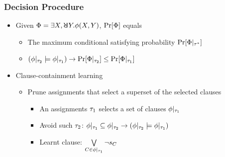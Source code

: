 \begin{frame}
    \frametitle{Decision Procedure}
    \begin{itemize}
        \item Given $\Qf=\exists X,\random{} Y.\pf(X,Y)$, $\Pr[\Phi]$ equals
              \pause
              \begin{itemize}
                  \item The maximum conditional satisfying probability $\Pr[\Phi|_{\tau^*}]$
                        \pause
                  \item $(\phi|_{\tau_2}\models\phi|_{\tau_1})\rightarrow\Pr[\Phi|_{\tau_2}]\leq\Pr[\Phi|_{\tau_1}]$
                        \pause
              \end{itemize}
        \item Clause-containment learning
              \pause
              \begin{itemize}
                  \item Prune assignments that select a superset of the selected clauses
                        \pause
                        \begin{itemize}
                            \item An assignments $\tau_1$ selects a set of clauses $\phi|_{\tau_1}$
                                  \pause
                            \item Avoid such $\tau_2$: $\phi|_{\tau_1}\subseteq\phi|_{\tau_2}\rightarrow(\phi|_{\tau_2}\models\phi|_{\tau_1})$
                                  \pause
                            \item Learnt clause: $\bigvee\limits_{C\in\phi|_{\tau_1}}\lnot s_{C}$
                        \end{itemize}
              \end{itemize}
    \end{itemize}
\end{frame}

